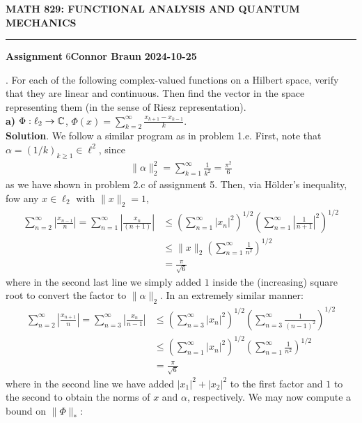 \documentclass[10pt]{article}
\newcommand{\1}[1]{\mathbbm{1}_{#1}} \newcommand{\mc}[1]{\mathcal{#1}}
\begin{document}
    \begin{center}
        {\bf\large{MATH 829: FUNCTIONAL ANALYSIS AND QUANTUM MECHANICS}}
        \smallskip
        \hrule
        \smallskip
        {\bf Assignment} 6\hfill {\bf Connor Braun} \hfill {\bf 2024-10-25}
    \end{center}
    \vspace{5pt}
    . For each of the following complex-valued functions on a Hilbert space, verify that they are linear and continuous. Then find the vector in the space representing them (in the sense of Riesz representation).\\[5pt]
    {\bf a)} $\Phi:\ell_2\rightarrow\mathbb{C}$, $\Phi(x)=\sum_{k=2}^\infty\frac{x_{k+1}-x_{k-1}}{k}$.\\[5pt]
    {\bf Solution}. We follow a similar program as in problem 1.e. First, note that $\alpha=(1/k)_{k\geq 1}\in\ell^2$, since
    \begin{align*}
        \|\alpha\|_2^2=\sum_{k=1}^\infty\frac{1}{k^2}=\frac{\pi^2}{6}
    \end{align*}
    as we have shown in problem 2.c of assignment 5. Then, via H\"older's inequality, fow any $x\in\ell_2$ with $\|x\|_2=1$,
    \begin{align*}
        \sum_{n=2}^\infty\left|\frac{x_{n-1}}{n}\right|=\sum_{n=1}^\infty\left|\frac{x_n}{(n+1)}\right|&\leq\left(\sum_{n=1}^\infty|x_n|^2\right)^{1/2}\left(\sum_{n=1}^\infty\left|\frac{1}{n+1}\right|^2\right)^{1/2}\\
        &\leq\|x\|_2\left(\sum_{n=1}^\infty\frac{1}{n^2}\right)^{1/2}\\
        &=\frac{\pi}{\sqrt{6}}\tag{4}
    \end{align*}
    where in the second last line we simply added $1$ inside the (increasing) square root to convert the factor to $\|\alpha\|_2$. In an extremely similar manner:
    \begin{align*}
        \sum_{n=2}^\infty\left|\frac{x_{n+1}}{n}\right|=\sum_{n=3}^\infty\left|\frac{x_n}{n-1}\right|&\leq\left(\sum_{n=3}^\infty|x_n|^2\right)^{1/2}\left(\sum_{n=3}^\infty\frac{1}{(n-1)^2}\right)^{1/2}\\
        &\leq \left(\sum_{n=1}^\infty|x_n|^2\right)^{1/2}\left(\sum_{n=1}^\infty\frac{1}{n^2}\right)^{1/2}\\
        &=\frac{\pi}{\sqrt{6}}\tag{5}
    \end{align*}
    where in the second line we have added $|x_1|^2+|x_2|^2$ to the first factor and $1$ to the second to obtain the norms of $x$ and $\alpha$, respectively. We may now compute a bound on $\|\Phi\|_\ast$:
\end{document}
